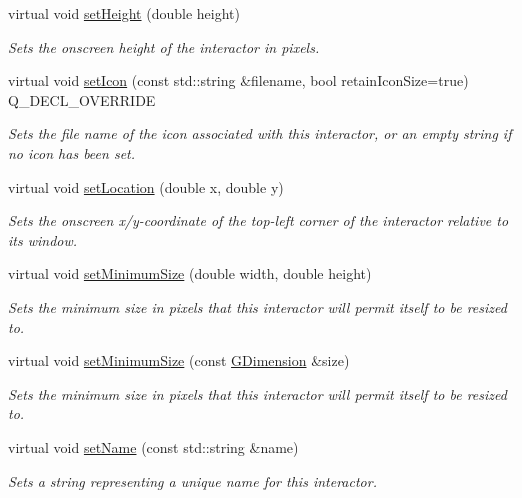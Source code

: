 \begin{DoxyCompactItemize}
virtual void \mbox{\hyperlink{classGInteractor_a9e280bfc4544dfaf8e4376c4e1a74357}{set\+Height}} (double height)
\begin{DoxyCompactList}\small\item\em Sets the onscreen height of the interactor in pixels. \end{DoxyCompactList}\item 
virtual void \mbox{\hyperlink{classGButton_a75753a3d7d3364185f8088d63b664cb1}{set\+Icon}} (const std\+::string \&filename, bool retain\+Icon\+Size=true) Q\+\_\+\+D\+E\+C\+L\+\_\+\+O\+V\+E\+R\+R\+I\+DE
\begin{DoxyCompactList}\small\item\em Sets the file name of the icon associated with this interactor, or an empty string if no icon has been set. \end{DoxyCompactList}\item 
virtual void \mbox{\hyperlink{classGInteractor_a04594e8ba9b98513a64f1da00dcae18c}{set\+Location}} (double x, double y)
\begin{DoxyCompactList}\small\item\em Sets the onscreen x/y-\/coordinate of the top-\/left corner of the interactor relative to its window. \end{DoxyCompactList}\item 
virtual void \mbox{\hyperlink{classGInteractor_a0cf428e207b7f22cc08138a90b1b87b2}{set\+Minimum\+Size}} (double width, double height)
\begin{DoxyCompactList}\small\item\em Sets the minimum size in pixels that this interactor will permit itself to be resized to. \end{DoxyCompactList}\item 
virtual void \mbox{\hyperlink{classGInteractor_a3b1046117ac6cb7abe467e00ba8a81f4}{set\+Minimum\+Size}} (const \mbox{\hyperlink{classGDimension}{G\+Dimension}} \&size)
\begin{DoxyCompactList}\small\item\em Sets the minimum size in pixels that this interactor will permit itself to be resized to. \end{DoxyCompactList}\item 
virtual void \mbox{\hyperlink{classGInteractor_a9d3a2685df23b5e7cbf59c19c4a1f9b5}{set\+Name}} (const std\+::string \&name)
\begin{DoxyCompactList}\small\item\em Sets a string representing a unique name for this interactor. \end{DoxyCompactList}\item 

\end{DoxyCompactItemize}
